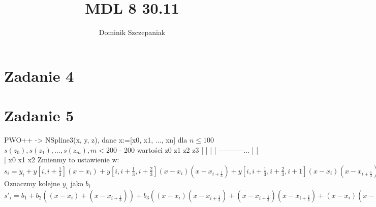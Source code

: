 \documentclass[12pt]{article}
\title{MDL 8 30.11}
\author{Dominik Szczepaniak}
\begin{document}
\maketitle
\bgroup\obeylines

\section{Zadanie 4}

\section{Zadanie 5}
PWO++ -> NSpline3(x, y, z), dane x:=[x0, x1, ..., xn] dla $n \leq 100$
$s(z_0), s(z_1), \dots, s(z_m), m < 200$ - 200 wartości 
z0 z1 z2 z3
 |  | |  |
-----------... 
|    |    |  
x0   x1   x2 
Zmienmy to ustawienie w:
$s_i = y_i + y[i, i+\frac{1}{3}](x-x_i) + y[i, i+\frac{1}{3}, i+\frac{2}{3}](x-x_i)(x-x_{i+\frac{1}{3}}) + y[i, i+\frac{1}{3}, i+\frac{2}{3}, i+1](x-x_i)(x-x_{i+\frac{1}{3}})(x-x_{i+\frac{2}{3}})$
Oznaczmy kolejne $y_i$ jako $b_i$
$s'_i = b_1 + b_2((x-x_i)+(x-x_{i+\frac{1}{3}})) + b_3((x-x_i)(x-x_{i+\frac{1}{3}}) + (x-x_{i+\frac{1}{3}})(x-x_{i+\frac{2}{3}}) + (x-x_i)(x-x_{i+\frac{2}{3}}))$
\egroup
\end{document}
